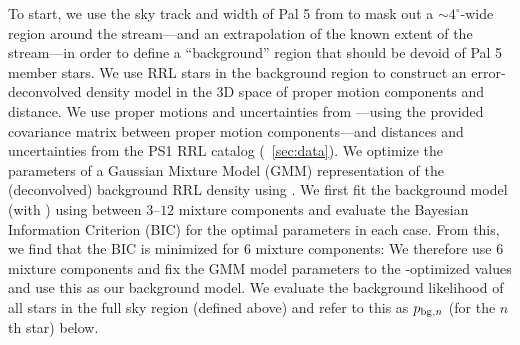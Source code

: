 \documentclass[twocolumn]{aastex63}
\newcommand{\sa}[1]{{\color{teal} SP: #1}}
\begin{document}
To start, we use the sky track and width of Pal 5 from \citet{Bonaca:2019} to mask out a $\sim4^\circ$-wide region around the stream---and an extrapolation of the known extent of the stream---in order to define a ``background'' region that should be devoid of Pal 5 member stars.
We use RRL stars in the background region to construct an error-deconvolved density model in the 3D space of proper motion components and distance.
We use proper motions and uncertainties from \Gaia---using the provided covariance matrix between proper motion components---and distances and uncertainties from the PS1 RRL catalog (\sectionname~\ref{sec:data}).
We optimize the parameters of a Gaussian Mixture Model (GMM) representation of the (deconvolved) background RRL density using  \citep[;][]{Bovy:XD}.
We first fit the background model (with ) using between $3$--$12$ mixture components and evaluate the Bayesian Information Criterion (BIC) for the optimal parameters in each case.
From this, we find that the BIC is minimized for 6 mixture components: We therefore use 6 mixture components and fix the GMM model parameters to the -optimized values and use this as our background model.
We evaluate the background likelihood of all stars in the full sky region (defined above) and refer to this as $p_{{\rm bg}, n}$ (for the $n$th star) below.
\end{document}
